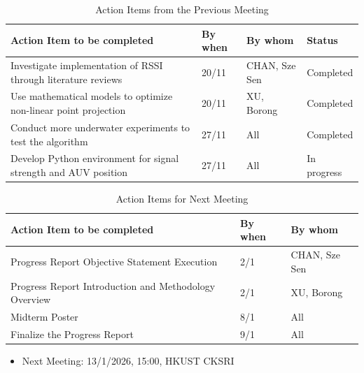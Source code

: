 \documentclass[11pt]{article}
\begin{document}
    \begin{longtable}[c]{|l|l|l|l|}
        \caption{Action Items from the Previous Meeting}\\
        \hline
        \textbf{Action Item to be completed} & \textbf{By when} & \textbf{By whom} & \textbf{Status} \\
        \hline
        \endhead
        Investigate implementation of RSSI through literature reviews & 20/11 & CHAN, Sze Sen & Completed\\
        \hline
        Use mathematical models to optimize non-linear point projection & 20/11 & XU, Borong & Completed\\
        \hline
        Conduct more underwater experiments to test the algorithm & 27/11 & All & Completed\\
        \hline
        Develop Python environment for signal strength and AUV position & 27/11 & All & In progress\\
        \hline
    \end{longtable}
    \begin{longtable}[c]{|l|l|l|}
        \caption{Action Items for Next Meeting}\\
        \hline
        \textbf{Action Item to be completed} & \textbf{By when} & \textbf{By whom} \\
        \hline
        \endhead
        Progress Report Objective Statement Execution & 2/1 & CHAN, Sze Sen \\
        \hline
        Progress Report Introduction and Methodology Overview  & 2/1 & XU, Borong \\
        \hline
        Midterm Poster & 8/1 & All \\
        \hline
        Finalize the Progress Report & 9/1 & All \\
        \hline
    \end{longtable}
    \begin{itemize}
    \item Next Meeting: 13/1/2026, 15:00, HKUST CKSRI
    \end{itemize}
    \newpage
\end{document}
